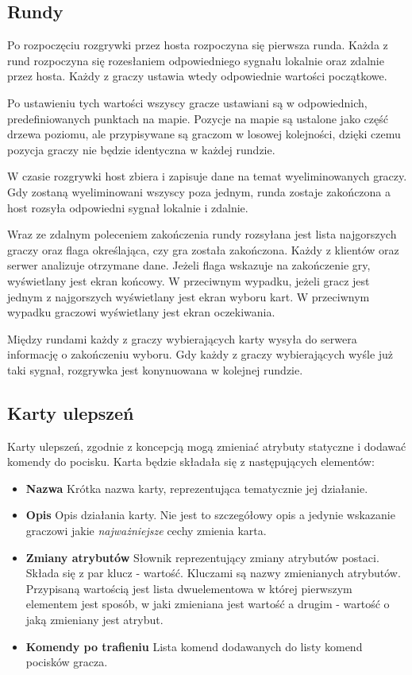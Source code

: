 \subsection{Rundy}
Po rozpoczęciu rozgrywki przez hosta rozpoczyna się pierwsza runda. Każda z rund rozpoczyna się rozesłaniem odpowiedniego sygnału lokalnie oraz zdalnie przez hosta. Każdy z graczy ustawia wtedy odpowiednie wartości początkowe. 

Po ustawieniu tych wartości wszyscy gracze ustawiani są w odpowiednich, predefiniowanych punktach na mapie. Pozycje na mapie są ustalone jako część drzewa poziomu, ale przypisywane są graczom w losowej kolejności, dzięki czemu pozycja graczy nie będzie identyczna w każdej rundzie.

W czasie rozgrywki host zbiera i zapisuje dane na temat wyeliminowanych graczy. Gdy zostaną wyeliminowani wszyscy poza jednym, runda zostaje zakończona a host rozsyła odpowiedni sygnał lokalnie i zdalnie. 

Wraz ze zdalnym poleceniem zakończenia rundy rozsyłana jest lista najgorszych graczy oraz flaga określająca, czy gra została zakończona. Każdy z klientów oraz serwer analizuje otrzymane dane. Jeżeli flaga wskazuje na zakończenie gry, wyświetlany jest ekran końcowy. W przeciwnym wypadku, jeżeli gracz jest jednym z najgorszych wyświetlany jest ekran wyboru kart. W przeciwnym wypadku graczowi wyświetlany jest ekran oczekiwania.

Między rundami każdy z graczy wybierających karty wysyła do serwera informację o zakończeniu wyboru. Gdy każdy z graczy wybierających wyśle już taki sygnał, rozgrywka jest konynuowana w kolejnej rundzie. 

\subsection{Karty ulepszeń}\label{sec:cards_design}
Karty ulepszeń, zgodnie z koncepcją mogą zmieniać atrybuty statyczne i dodawać komendy do pocisku. Karta będzie składała się z następujących elementów:

\begin{itemize}
    \item \textbf{Nazwa} Krótka nazwa karty, reprezentująca tematycznie jej działanie.
    \item \textbf{Opis} Opis działania karty. Nie jest to szczegółowy opis a jedynie wskazanie graczowi jakie \emph{najważniejsze} cechy zmienia karta.
    \item \textbf{Zmiany atrybutów} Słownik reprezentujący zmiany atrybutów postaci. Składa się z par klucz - wartość. Kluczami są nazwy zmienianych atrybutów. Przypisaną wartością jest lista dwuelementowa w której pierwszym elementem jest sposób, w jaki zmieniana jest wartość a drugim - wartość o jaką zmieniany jest atrybut. 
    \item \textbf{Komendy po trafieniu} Lista komend dodawanych do listy komend pocisków gracza.
\end{itemize}

